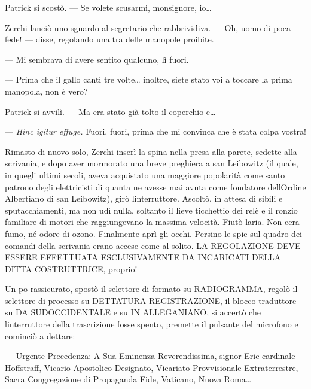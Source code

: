 	Patrick si scostò. --- Se volete scusarmi, monsignore, io\ldots{}
	
	Zerchi lanciò uno sguardo al segretario che rabbrividiva. --- Oh, uomo
	di poca fede! --- disse, regolando un\textquotesingle altra delle
	manopole proibite.
	
	--- Mi sembrava di avere sentito qualcuno, lì fuori.
	
	--- Prima che il gallo canti tre volte\ldots{} inoltre, siete stato voi
	a toccare la prima manopola, non è vero?
	
	Patrick si avvilì. --- Ma era stato già tolto il coperchio e\ldots{}
	
	--- \emph{Hinc igitur effuge.} Fuori, fuori, prima che mi convinca che è
	stata colpa vostra!
	
	Rimasto di nuovo solo, Zerchi inserì la spina nella presa alla parete,
	sedette alla scrivania, e dopo aver mormorato una breve preghiera a san
	Leibowitz (il quale, in quegli ultimi secoli, aveva acquistato una
	maggiore popolarità come santo patrono degli elettricisti di quanta ne
	avesse mai avuta come fondatore dell\textquotesingle Ordine Albertiano
	di san Leibowitz), girò l\textquotesingle interruttore. Ascoltò, in
	attesa di sibili e sputacchiamenti, ma non udì nulla, soltanto il lieve
	ticchettio dei relè e il ronzio familiare di motori che raggiungevano la
	massima velocità. Fiutò l\textquotesingle aria. Non
	c\textquotesingle era fumo, né odore di ozono. Finalmente aprì gli
	occhi. Persino le spie sul quadro dei comandi della scrivania erano
	accese come al solito. LA REGOLAZIONE DEVE ESSERE EFFETTUATA
	ESCLUSIVAMENTE DA INCARICATI DELLA DITTA COSTRUTTRICE, proprio!
	
	Un po\textquotesingle{} rassicurato, spostò il selettore di formato su
	RADIOGRAMMA, regolò il selettore di processo su DETTATURA-REGISTRAZIONE,
	il blocco traduttore su DA SUDOCCIDENTALE e su IN ALLEGANIANO, si
	accertò che l\textquotesingle interruttore della trascrizione fosse
	spento, premette il pulsante del microfono e cominciò a dettare:
	
	--- Urgente-Precedenza: A Sua Eminenza Reverendissima, signor Eric
	cardinale Hoffstraff, Vicario Apostolico Designato, Vicariato
	Provvisionale Extraterrestre, Sacra Congregazione di Propaganda Fide,
	Vaticano, Nuova Roma\ldots{}
	
